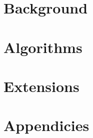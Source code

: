 \documentclass[a4paper, 11pt]{book}
\begin{document}
\frontmatter
	\maketitle	
		
	\setcounter{tocdepth}{1}
	\tableofcontents
	
	
	
\mainmatter 
	\part{Background}
	
		
	\part{Algorithms}
	
	
	
	
	
	
	
	
	\part{Extensions}
	

\backmatter 
  \part{Appendicies}
	\begin{appendix}
		
	\end{appendix}	
	
	\cleardoublepage{} 
	\printindex
\end{document}
